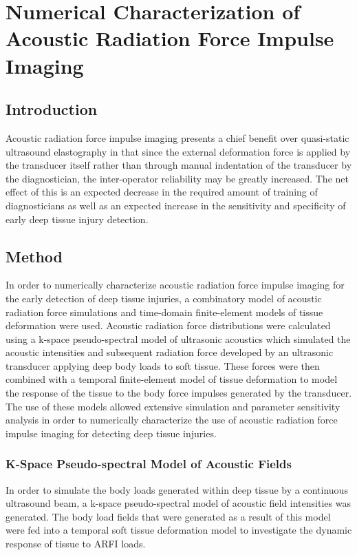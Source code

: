 \chapter{Numerical Characterization of Acoustic Radiation Force Impulse Imaging}
	\label{chap:arfi}
	\section{Introduction}
		Acoustic radiation force impulse imaging presents a chief benefit over quasi-static ultrasound elastography in that since the external deformation force is applied by the transducer itself rather than through manual indentation of the transducer by the diagnostician, the inter-operator reliability may be greatly increased. The net effect of this is an expected decrease in the required amount of training of diagnosticians as well as an expected increase in the sensitivity and specificity of early deep tissue injury detection.

	\section{Method}
	\label{sec:arfi_methods}
		In order to numerically characterize acoustic radiation force impulse imaging for the early detection of deep tissue injuries, a combinatory model of acoustic radiation force simulations and time-domain finite-element models of tissue deformation were used. Acoustic radiation force distributions were calculated using a k-space pseudo-spectral model of ultrasonic acoustics which simulated the acoustic intensities and subsequent radiation force developed by an ultrasonic transducer applying deep body loads to soft tissue. These forces were then combined with a temporal finite-element model of tissue deformation to model the response of the tissue to the body force impulses generated by the transducer. The use of these models allowed extensive simulation and parameter sensitivity analysis in order to numerically characterize the use of acoustic radiation force impulse imaging for detecting deep tissue injuries.

		\subsection{K-Space Pseudo-spectral Model of Acoustic Fields}
		\label{subsec:kspace_model}
			In order to simulate the body loads generated within deep tissue by a continuous ultrasound beam, a k-space pseudo-spectral model of acoustic field intensities was generated. The body load fields that were generated as a result of this model were fed into a temporal soft tissue deformation model to investigate the dynamic response of tissue to ARFI loads.


